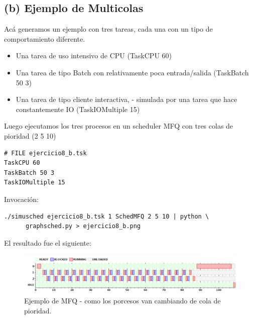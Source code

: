 \subsection{(b) Ejemplo de Multicolas}

Ac\'a generamos un ejemplo con tres tareas, cada una con un tipo de comportamiento diferente.

\begin{itemize}
 \item Una tarea de uso intensivo de CPU (TaskCPU 60)
 \item Una tarea de tipo Batch con relativamente poca entrada/salida (TaskBatch 50 3)
 \item Una tarea de tipo cliente interactiva, - simulada por una tarea que hace constantemente IO (TaskIOMultiple 15)
\end{itemize}

Luego ejecutamos los tres procesos en un scheduler MFQ con tres colas de pioridad (2 5 10)

\begin{framed}
\begin{verbatim}
# FILE ejercicio8_b.tsk
TaskCPU 60
TaskBatch 50 3
TaskIOMultiple 15
\end{verbatim}
\end{framed}

Invocaci\'on:

\begin{framed}
\begin{verbatim}
./simusched ejercicio8_b.tsk 1 SchedMFQ 2 5 10 | python \
      graphsched.py > ejercicio8_b.png
\end{verbatim}
\end{framed}

El resultado fue el siguiente:

\begin{figure}[H]
  \caption{Ejemplo de MFQ - como los porcesos van cambiando de cola de pioridad.}
  \centering
    \includegraphics[width=1\textwidth]{img/ejercicio8_a.png}
\end{figure}

